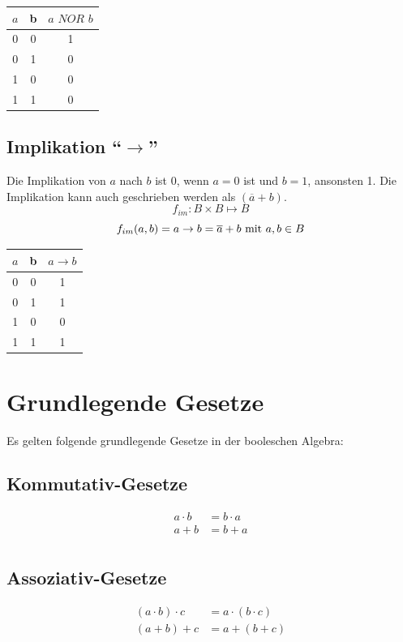 \documentclass[11pt,a4paper]{scrreprt}
\begin{document}
\begin{center}
\begin{tabular}{ccc}
	$a$ & b & $a \textit{ NOR } b$ \\ \hline
	 0  & 0 &    1    \\
	 0  & 1 &    0    \\
	 1  & 0 &    0    \\
	 1  & 1 &    0    \\
\end{tabular}
\end{center}

\subsection{Implikation "`$\rightarrow$"'}
Die Implikation von $a$ nach $b$ ist 0, wenn $a = 0$ ist und $b = 1$, ansonsten 1. Die Implikation kann auch geschrieben werden als $(\overline{a} + b)$.
$$ f_{im}: B \times B \mapsto B $$
$$ f_{im}(a, b) = a \rightarrow b = \overline{a} + b \textnormal{ mit } a, b \in B$$

\begin{center}
\begin{tabular}{ccc}
	$a$ & b & $a \rightarrow b$ \\ \hline
	 0  & 0 &    1    \\
	 0  & 1 &    1    \\
	 1  & 0 &    0    \\
	 1  & 1 &    1    \\
\end{tabular}
\end{center}

\section{Grundlegende Gesetze}
Es gelten folgende grundlegende Gesetze in der booleschen Algebra:

\subsection*{Kommutativ-Gesetze}
\begin{align*}
	a \cdot b & = b \cdot a \\
	a + b & = b + a \\
\end{align*}

\subsection*{Assoziativ-Gesetze}
\begin{align*}
	(a \cdot b) \cdot c & = a \cdot (b \cdot c) \\
	(a + b) + c & = a + (b + c) \\
\end{align*}
\end{document}
